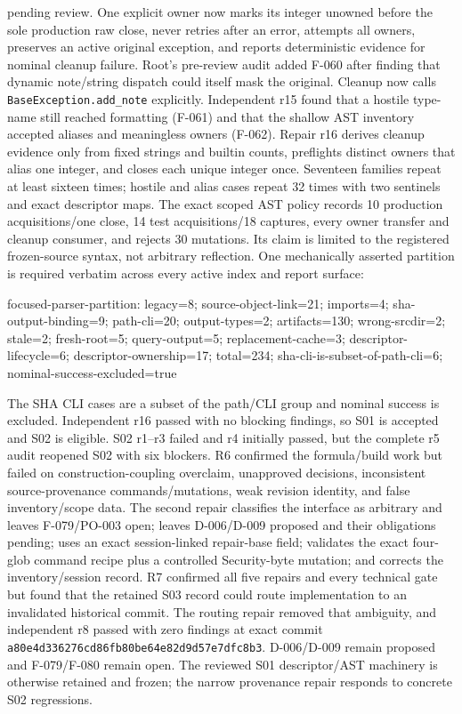 \documentclass[11pt]{article}
\begin{document}
pending review. One explicit owner now marks its integer unowned before the sole production raw
close, never retries after an error, attempts all owners, preserves an active original exception,
and reports deterministic evidence for nominal cleanup failure. Root's pre-review audit added
F-060 after finding that dynamic note/string dispatch could itself mask the original. Cleanup now
calls \texttt{BaseException.add\_note} explicitly. Independent r15 found that a hostile type-name
still reached formatting (F-061) and that the shallow AST inventory accepted aliases and meaningless
owners (F-062). Repair r16 derives cleanup evidence only from fixed strings and builtin counts,
preflights distinct owners that alias one integer, and closes each unique integer once. Seventeen
families repeat at least sixteen times; hostile and alias cases repeat 32 times with two sentinels
and exact descriptor maps. The exact scoped AST policy records 10 production acquisitions/one close,
14 test acquisitions/18 captures, every owner transfer and cleanup consumer, and rejects 30
mutations. Its claim is limited to the registered frozen-source syntax, not arbitrary reflection. One mechanically
asserted partition is required verbatim across every active index and report surface:

{\sloppy\ttfamily\scriptsize
focused-parser-partition: legacy=8; source-object-link=21; imports=4; sha-output-binding=9; path-cli=20; output-types=2; artifacts=130; wrong-srcdir=2; stale=2; fresh-root=5; query-output=5; replacement-cache=3; descriptor-lifecycle=6; descriptor-ownership=17; total=234; sha-cli-is-subset-of-path-cli=6; nominal-success-excluded=true
\par}

The SHA CLI cases are a subset of the path/CLI group and nominal success is excluded. Independent
r16 passed with no blocking findings, so S01 is accepted and S02 is eligible. S02 r1--r3 failed and
r4 initially passed, but the complete r5 audit reopened S02 with six blockers. R6 confirmed the
formula/build work but failed on construction-coupling overclaim, unapproved decisions, inconsistent
source-provenance commands/mutations, weak revision identity, and false inventory/scope data. The
second repair classifies the interface as arbitrary and leaves F-079/PO-003 open; leaves D-006/D-009
proposed and their obligations pending; uses an exact session-linked repair-base field; validates
the exact four-glob command recipe plus a controlled Security-byte mutation; and corrects the
inventory/session record. R7 confirmed all five repairs and every technical gate but found that the
retained S03 record could route implementation to an invalidated historical commit. The routing
repair removed that ambiguity, and independent r8 passed with zero findings at exact commit
\texttt{a80e4d336276cd86fb80be64e82d9d57e7dfc8b3}. D-006/D-009 remain proposed and
F-079/F-080 remain open. The reviewed S01
descriptor/AST machinery is otherwise retained and frozen; the narrow provenance repair responds
to concrete S02 regressions.
\end{document}
